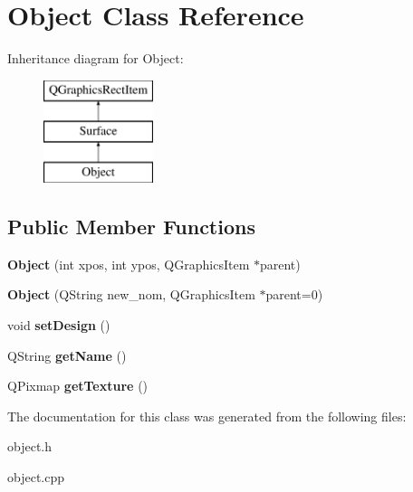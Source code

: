 \hypertarget{class_object}{}\section{Object Class Reference}
\label{class_object}
Inheritance diagram for Object\+:\begin{figure}[H]
\begin{center}
\leavevmode
\includegraphics[height=3.000000cm]{class_object}
\end{center}
\end{figure}
\subsection*{Public Member Functions}
\begin{DoxyCompactItemize}
\item 
\hypertarget{class_object_a61b5e9862ead7000e3125be5d81263a2}{}{\bfseries Object} (int xpos, int ypos, Q\+Graphics\+Item $\ast$parent)\label{class_object_a61b5e9862ead7000e3125be5d81263a2}

\item 
\hypertarget{class_object_a92bae89e044afc5957483772f557c5d7}{}{\bfseries Object} (Q\+String new\+\_\+nom, Q\+Graphics\+Item $\ast$parent=0)\label{class_object_a92bae89e044afc5957483772f557c5d7}

\item 
\hypertarget{class_object_a64d92ae18b1e70a8435690fe6fccf1fd}{}void {\bfseries set\+Design} ()\label{class_object_a64d92ae18b1e70a8435690fe6fccf1fd}

\item 
\hypertarget{class_object_a13fe059222e66ea54aa3f6f8615a3d72}{}Q\+String {\bfseries get\+Name} ()\label{class_object_a13fe059222e66ea54aa3f6f8615a3d72}

\item 
\hypertarget{class_object_a2678fa7a8ab432607b228e8d311f2873}{}Q\+Pixmap {\bfseries get\+Texture} ()\label{class_object_a2678fa7a8ab432607b228e8d311f2873}

\end{DoxyCompactItemize}


The documentation for this class was generated from the following files\+:\begin{DoxyCompactItemize}
\item 
object.\+h\item 
object.\+cpp\end{DoxyCompactItemize}
